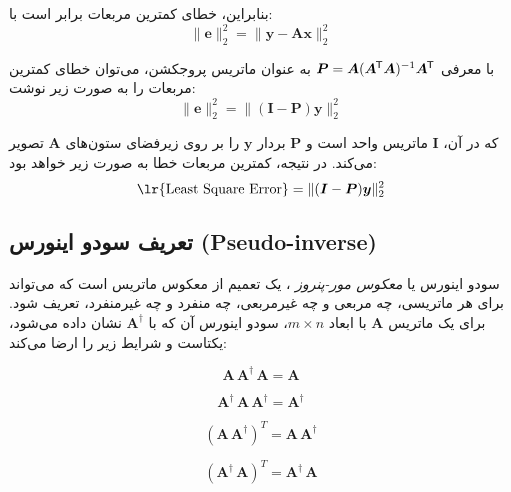 \documentclass[12pt,onecolumn,a4paper]{article}
\newcommand*{\transpose}{{\mkern-1.5mu\mathsf{T}}}
\begin{document}
بنابراین، خطای کمترین مربعات برابر است با:
\begin{equation}
	\| \bm{e} \|_2^2 = \| \bm{y} - \bm{A} \bm{x} \|_2^2
\end{equation}

با معرفی \( \bm{P} = \bm{A} (\bm{A}^\transpose \bm{A})^{-1} \bm{A}^\transpose \) به عنوان ماتریس پروجکشن، می‌توان خطای کمترین مربعات را به صورت زیر نوشت:
\begin{equation}
	\| \bm{e} \|_2^2 = \| (\bm{I} - \bm{P}) \bm{y} \|_2^2
\end{equation}

که در آن، \( \bm{I} \) ماتریس واحد است و \( \bm{P} \) بردار \( \bm{y} \) را بر روی زیرفضای ستون‌های \( \bm{A} \) تصویر می‌کند. در نتیجه، کمترین مربعات خطا به صورت زیر خواهد بود:
\begin{equation}
	\text{\lr{Least Square Error}} = \| (\bm{I} - \bm{P}) \bm{y} \|_2^2
\end{equation}




\subsection{تعریف سودو اینورس (Pseudo-inverse)}



\noindent
سودو اینورس یا \textit{معکوس مور-پنروز}
، یک تعمیم از معکوس ماتریس است که می‌تواند برای هر ماتریسی، چه مربعی و چه غیرمربعی، چه منفرد و چه غیرمنفرد، تعریف شود. برای یک ماتریس \( \bm{A} \) با ابعاد \( m \times n \)، سودو اینورس آن که با \( \bm{A}^\dagger \) نشان داده می‌شود، یکتاست و شرایط زیر را ارضا می‌کند:

\begin{equation}
	\bm{A} \, \bm{A}^\dagger \, \bm{A} = \bm{A}
\end{equation}

\begin{equation}
	\bm{A}^\dagger \, \bm{A} \, \bm{A}^\dagger = \bm{A}^\dagger
\end{equation}

\begin{equation}
	(\bm{A} \, \bm{A}^\dagger)^T = \bm{A} \, \bm{A}^\dagger
\end{equation}

\begin{equation}
	(\bm{A}^\dagger \, \bm{A})^T = \bm{A}^\dagger \, \bm{A}
\end{equation}
\end{document}
